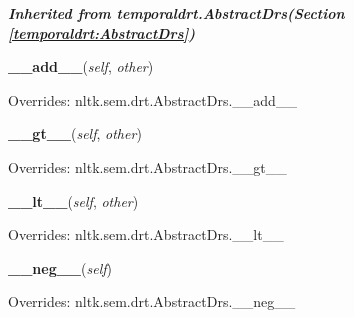 \large{\textbf{\textit{Inherited from temporaldrt.AbstractDrs\textit{(Section \ref{temporaldrt:AbstractDrs})}}}}

    \vspace{0.5ex}

\hspace{.8\funcindent}\begin{boxedminipage}{\funcwidth}

    \raggedright \textbf{\_\_add\_\_}(\textit{self}, \textit{other})

\setlength{\parskip}{2ex}
\setlength{\parskip}{1ex}
      Overrides: nltk.sem.drt.AbstractDrs.\_\_add\_\_

    \end{boxedminipage}

    \vspace{0.5ex}

\hspace{.8\funcindent}\begin{boxedminipage}{\funcwidth}

    \raggedright \textbf{\_\_gt\_\_}(\textit{self}, \textit{other})

\setlength{\parskip}{2ex}
\setlength{\parskip}{1ex}
      Overrides: nltk.sem.drt.AbstractDrs.\_\_gt\_\_

    \end{boxedminipage}

    \vspace{0.5ex}

\hspace{.8\funcindent}\begin{boxedminipage}{\funcwidth}

    \raggedright \textbf{\_\_lt\_\_}(\textit{self}, \textit{other})

\setlength{\parskip}{2ex}
\setlength{\parskip}{1ex}
      Overrides: nltk.sem.drt.AbstractDrs.\_\_lt\_\_

    \end{boxedminipage}

    \vspace{0.5ex}

\hspace{.8\funcindent}\begin{boxedminipage}{\funcwidth}

    \raggedright \textbf{\_\_neg\_\_}(\textit{self})

\setlength{\parskip}{2ex}
\setlength{\parskip}{1ex}
      Overrides: nltk.sem.drt.AbstractDrs.\_\_neg\_\_

    \end{boxedminipage}

